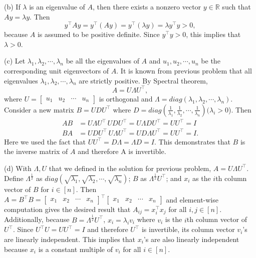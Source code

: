 \documentclass[11pt]{exam}
\theoremstyle{quest}
\begin{document}
(b) If $\lambda$ is an eigenvalue of $A$, then there exists a nonzero vector $y \in \mathbb{R}$ such that $Ay = \lambda y$. Then
\[
y^\top A y = y^\top (Ay) = y^\top (\lambda y) = \lambda y^\top y > 0,
\]
because $A$ is assumed to be positive definite. Since $y^\top y > 0$, this implies that $\lambda > 0$.

(c) Let $\lambda_1, \lambda_2, \cdots, \lambda_n$ be all the eigenvalues of $A$ and $u_1, u_2, \cdots, u_n$ be the corresponding unit eigenvectors of $A$. It is known from previous problem that all eigenvalues $\lambda_1, \lambda_2, \cdots, \lambda_n$ are strictly positive. By Spectral theorem, 
\[
A = U\Lambda U^\top,
\]
where $U = \begin{bmatrix}u_1&  u_2&\cdots &u_n\end{bmatrix}$ is orthogonal and $\Lambda = diag(\lambda_1, \lambda_2, \cdots, \lambda_n).$ Consider a new matrix $B = UDU^\top$ where $D = diag(\frac{1}{\lambda_1}, \frac{1}{\lambda_2}, \cdots, \frac{1}{\lambda_n}) (\lambda_i > 0 $). Then
\begin{align*}
AB &= U\Lambda U^\top \, UDU^\top = U \Lambda D U^\top = UU^\top = I\\
BA &= UD U^\top \,  U\Lambda U^\top = U D \Lambda U^\top = UU^\top = I.
\end{align*}
Here we used the fact that $UU^\top = D\Lambda = \Lambda D = I$. This demonstrates that $B$ is the inverse matrix of $A$ and therefore A is invertible. 


(d) With $\Lambda, U$ that we defined in the solution for previous problem, $A = U\Lambda U^\top$. Define $\Lambda^{\frac{1}{2}}$ as $diag(\sqrt{\lambda_1}, \sqrt{\lambda_2}, \cdots, \sqrt{\lambda_n})$; $B$ as $\Lambda^{\frac{1}{2}}U^\top$; and $x_i$ as the $i$th column vector of $B$ for $i \in [n]$. Then $A = B^\top B = \begin{bmatrix} x_1& x_2 & \cdots & x_n\end{bmatrix}^\top  \begin{bmatrix} x_1& x_2 & \cdots & x_n\end{bmatrix}$ and element-wise computation gives the desired result that $A_{ij} = x_i^\top x_j$ for all $i,j \in [n]$. Additionally, because $B = \Lambda^{\frac{1}{2}}U^\top$,  $x_i = \lambda_i v_i$  where $v_i$ is the $i$th column vector of $U^\top$.  Since $U^\top U = UU^\top = I$ and therefore $U^\top$ is invertible, its column vector $v_i$'s are linearly independent. This implies that $x_i$'s are also linearly independent because $x_i$ is a constant multiple of $v_i$ for all $i \in [n]$.
\end{document}
